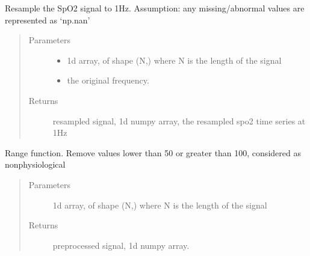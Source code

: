 \documentclass[letterpaper,10pt,english]{sphinxmanual}
\begin{document}
\begin{fulllineitems}
\label{\detokenize{pobm:pobm.prep.resamp_spo2}}
Resample the SpO2 signal to 1Hz.
Assumption: any missing/abnormal values are represented as ‘np.nan’
\begin{quote}\begin{description}
\item[{Parameters}] \leavevmode\begin{itemize}
\item {} 
 \textendash{} 1\sphinxhyphen{}d array, of shape (N,) where N is the length of the signal

\item {} 
 \textendash{} the original frequency.

\end{itemize}

\item[{Returns}] \leavevmode
resampled signal, 1\sphinxhyphen{}d numpy array, the resampled spo2 time series at 1Hz

\end{description}\end{quote}

\end{fulllineitems}


\begin{fulllineitems}
\label{\detokenize{pobm:pobm.prep.set_range}}
Range function. Remove values lower than 50 or greater than 100, considered as non\sphinxhyphen{}physiological
\begin{quote}\begin{description}
\item[{Parameters}] \leavevmode
{} \textendash{} 1\sphinxhyphen{}d array, of shape (N,) where N is the length of the signal

\item[{Returns}] \leavevmode
preprocessed signal, 1\sphinxhyphen{}d numpy array.

\end{description}\end{quote}

\end{fulllineitems}
\end{document}
